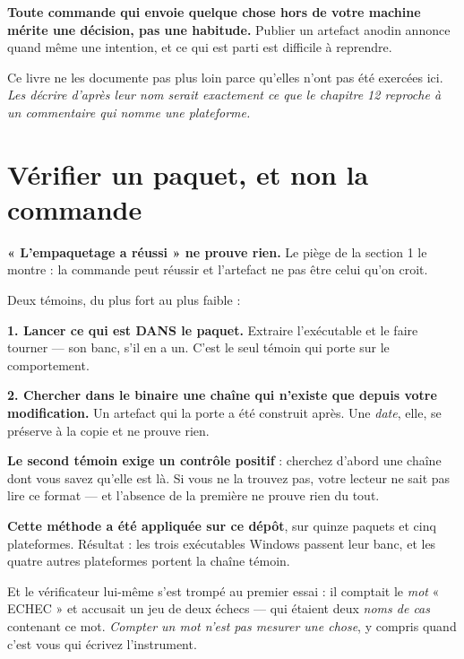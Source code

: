 \begin{nkretenir}
\textbf{Toute commande qui envoie quelque chose hors de votre machine mérite une
décision, pas une habitude.} Publier un artefact anodin annonce quand même une
intention, et ce qui est parti est difficile à reprendre.

Ce livre ne les documente pas plus loin parce qu'elles n'ont pas été exercées
ici. \emph{Les décrire d'après leur nom serait exactement ce que le chapitre 12
reproche à un commentaire qui nomme une plateforme.}
\end{nkretenir}

\section{Vérifier un paquet, et non la commande}

\begin{nkretenir}
\textbf{« L'empaquetage a réussi » ne prouve rien.} Le piège de la section 1 le
montre : la commande peut réussir et l'artefact ne pas être celui qu'on croit.

Deux témoins, du plus fort au plus faible :

\textbf{1. Lancer ce qui est DANS le paquet.} Extraire l'exécutable et le faire
tourner --- son banc, s'il en a un. C'est le seul témoin qui porte sur le
comportement.

\textbf{2. Chercher dans le binaire une chaîne qui n'existe que depuis votre
modification.} Un artefact qui la porte a été construit après. Une \emph{date},
elle, se préserve à la copie et ne prouve rien.

\alerte{} \textbf{Le second témoin exige un contrôle positif} : cherchez d'abord une
chaîne dont vous savez qu'elle est là. Si vous ne la trouvez pas, votre lecteur
ne sait pas lire ce format --- et l'absence de la première ne prouve rien du
tout.
\end{nkretenir}

\begin{nkretenir}
\textbf{Cette méthode a été appliquée sur ce dépôt}, sur quinze paquets et cinq
plateformes. Résultat : les trois exécutables Windows passent leur banc, et les
quatre autres plateformes portent la chaîne témoin.

Et le vérificateur lui-même s'est trompé au premier essai : il comptait le
\emph{mot} « ECHEC » et accusait un jeu de deux échecs --- qui étaient deux
\emph{noms de cas} contenant ce mot. \emph{Compter un mot n'est pas mesurer une
chose}, y compris quand c'est vous qui écrivez l'instrument.
\end{nkretenir}

